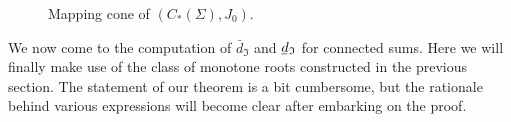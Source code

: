 \documentclass[11 pt]{amsart}
\theoremstyle{remark}
\newcommand{\bunderline}[1]{\underline{#1\mkern-2mu}\mkern2mu }
\def\du {\bar{d}}
\def\dl {\bunderline{d}}
\def\Inv{\mathfrak{I}}
\begin{document}
\begin{figure}[h!]
\caption{Mapping cone of $(C_*(\Sigma), J_0)$.}
\label{spectralseq}
\end{figure}

We now come to the computation of $\du_{\Inv}$ and $\dl_{\Inv}$ for connected sums. Here we will finally make use of the class of monotone roots constructed in the previous section. The statement of our theorem is a bit cumbersome, but the rationale behind various expressions will become clear after embarking on the proof.
\end{document}

